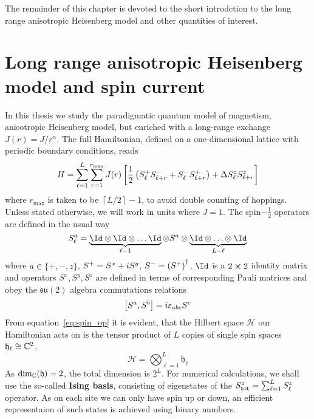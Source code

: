 The remainder of this chapter is devoted to the short introdction to the long range anisotropic Heisenberg model
and other quantities of interest.

\section{Long range anisotropic Heisenberg model and spin current}

In this thesis we study the paradigmatic quantum model of magnetism, anisotropic Heisenberg
model, but enriched with a long-range exchange \(J(r) = J/r^{\alpha}\). The full Hamiltonian, 
defined on a one-dimensional lattice with periodic boundary conditions, reads
\begin{equation}
    H = \sum_{\ell=1}^{L}\sum_{r=1}^{r_{\mathrm{max}}} J(r) \left[\frac{1}{2} \left(
        S^{+}_{\ell}S^{-}_{\ell+r} + S^{-}_{\ell}S^{+}_{\ell+r}\right) + \Delta S^{z}_{\ell}S^{z}_{\ell+r}
    \right]
    \label{eq:long_range}
\end{equation}
where \(r_{\mathrm{max}}\) is taken to be \(\left\lceil L/2\right\rceil - 1 \), to avoid double counting of hoppings.
Unless stated otherwise, we will work in units where \(J = 1\).
The spin\(-\frac{1}{2}\) operators are defined in the usual way
\begin{equation}
    S_{\ell}^{a} = \underbrace{\Id \otimes \Id \otimes \ldots \Id}_{\ell-1} \otimes S^{a} \otimes \underbrace{\Id \otimes \ldots \otimes \Id}_{L-\ell} 
    \label{eq:spin_op}
\end{equation} 
where \(a\in\{+,-,z\}\), \(S^{+} = S^x + i S^y\), \(S^{-} = \left(S^{+}\right)^{\dagger}\),
 \(\Id\) is a \(2\cross 2\) identity matrix and operators \(S^x,S^y,S^z\) are defined in terms
 of corresponding Pauli matrices and obey the \(\mathfrak{su}(2)\) algebra commutations relations
 \begin{equation}
    \comm{S^a}{S^b} = i \varepsilon_{abc} S^c
 \end{equation}
From equation~\eqref{eq:spin_op} it is evident, that the Hilbert space \(\mathcal{H}\) our Hamiltonian acts on
is the tensor product of \(L\) copies of single spin spaces \(\mathfrak{h}_{\ell} \cong \mathbb{C}^2\), 
\begin{equation}
    \mathcal{H} = \bigotimes_{\ell=1}^{L} \mathfrak{h}_{\ell}
\end{equation}
As \(\mathrm{dim_{\mathbb{C}}}(\mathfrak{h}) = 2\), the total dimension is \(2^L\).
For numerical calculations, we shall use the so-called \textbf{Ising basis}, consisting of eigenstates
of the \(S^z_{\mathrm{tot}} = \sum_{\ell=1}^{L} S^{z}_{\ell}\) operator. As on each site we can only
have spin up or down, an efficient representaion of such states is achieved using binary numbers.

